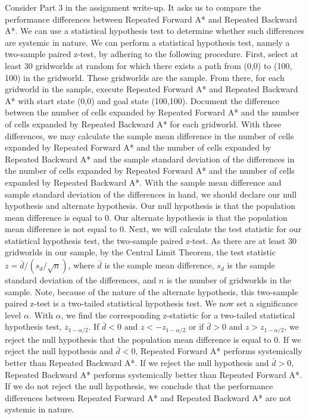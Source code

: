 \documentclass{article}
\begin{document}
Consider Part 3 in the assignment write-up. It asks us to compare the performance differences between Repeated Forward A* and Repeated Backward A*. We can use a statistical hypothesis test to determine whether such differences are systemic in nature. We can perform a statistical hypothesis test, namely a two-sample paired z-test, by adhering to the following procedure. First, select at least 30 gridworlds at random for which there exists a path from (0,0) to (100, 100) in the gridworld. These gridworlds are the sample. From there, for each gridworld in the sample, execute Repeated Forward A* and Repeated Backward A* with start state (0,0) and goal state (100,100). Document the difference between the number of cells expanded by Repeated Forward A* and the number of cells expanded by Repeated Backward A* for each gridworld. With these differences, we may calculate the sample mean difference in the number of cells expanded by Repeated Forward A* and the number of cells expanded by Repeated Backward A* and the sample standard deviation of the differences in the number of cells expanded by Repeated Forward A* and the number of cells expanded by Repeated Backward A*. With the sample mean difference and sample standard deviation of the differences in hand, we should declare our null hypothesis and alternate hypothesis. Our null hypothesis is that the population mean difference is equal to 0. Our alternate hypothesis is that the population mean difference is not equal to 0. Next, we will calculate the test statistic for our statistical hypothesis test, the two-sample paired z-test. As there are at least 30 gridworlds in our sample, by the Central Limit Theorem, the test statistic $z = \bar{d}/(s_{d}/\sqrt{n})$, where $\bar{d}$ is the sample mean difference, $s_{d}$ is the sample standard deviation of the differences, and $n$ is the number of gridworlds in the sample. Note, because of the nature of the alternate hypothesis, this two-sample paired z-test is a two-tailed statistical hypothesis test. We now set a significance level $\alpha$. With $\alpha$, we find the corresponding z-statistic for a two-tailed statistical hypothesis test, $z_{1-\alpha/2}$. If $\bar{d}<0$ and $z<-z_{1-\alpha/2}$ or if $\bar{d}>0$ and $z>z_{1-\alpha/2}$, we reject the null hypothesis that the population mean difference is equal to 0. If we reject the null hypothesis and $\bar{d}<0$, Repeated Forward A* performs systemically better than Repeated Backward A*. If we reject the null hypothesis and $\bar{d}>0$, Repeated Backward A* performs systemically better than Repeated Forward A*. If we do not reject the null hypothesis, we conclude that the performance differences between Repeated Forward A* and Repeated Backward A* are not systemic in nature.           
\end{document}
